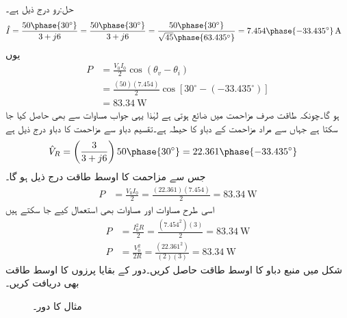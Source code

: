 حل:رو درج ذیل ہے۔
\begin{align*}
\hat{I}&=\frac{50\phase{30^{\circ}}}{3+j6}=\frac{50\phase{30^{\circ}}}{3+j6}=\frac{50\phase{30^{\circ}}}{\sqrt{45}\phase{63.435^{\circ}}}=7.454\phase{-33.435^{\circ}}\,\si{\ampere}
\end{align*}
یوں
\begin{align*}
P&=\frac{V_0 I_0}{2}\cos(\theta_v-\theta_i)\\
&=\frac{(50)(7.454)}{2}\cos[30^{\circ}-(-33.435^{\circ})]\\
&=\SI{83.34}{\watt}
\end{align*}
ہو گا۔چونکہ طاقت صرف مزاحمت میں ضائع ہوتی ہے لہٰذا یہی جواب مساوات  سے بھی حاصل کیا جا سکتا ہے جہاں  سے مراد مزاحمت کے دباو کا حیطہ ہے۔تقسیم دباو سے مزاحمت کا دباو درج ذیل ہے
\begin{align*}
\hat{V}_R&=\left(\frac{3}{3+j6}\right)50\phase{30^{\circ}}=22.361\phase{-33.435^{\circ}}
\end{align*}
جس سے مزاحمت کا اوسط طاقت درج ذیل ہو گا۔
\begin{align*}
P&=\frac{V_0 I_0}{2}=\frac{(22.361)(7.454)}{2}=\SI{83.34}{\watt}
\end{align*}
اسی طرح مساوات  اور مساوات  بھی استعمال کیے جا سکتے ہیں
\begin{align*}
P&=\frac{I^2_0 R}{2}=\frac{(7.454^2)(3)}{2}=\SI{83.34}{\watt}\\
P&=\frac{V^2_0}{2 R}=\frac{(22.361^2)}{(2)(3)}=\SI{83.34}{\watt}
\end{align*}
شکل  میں منبع دباو کا اوسط طاقت حاصل کریں۔دور کے بقایا پرزوں کا اوسط طاقت بھی دریافت کریں۔
\begin{figure}
\centering
{}
\caption{مثال  کا دور۔}
\label{شکل_طاقت_مزاحمت_امالہ_ب}
\end{figure} 

